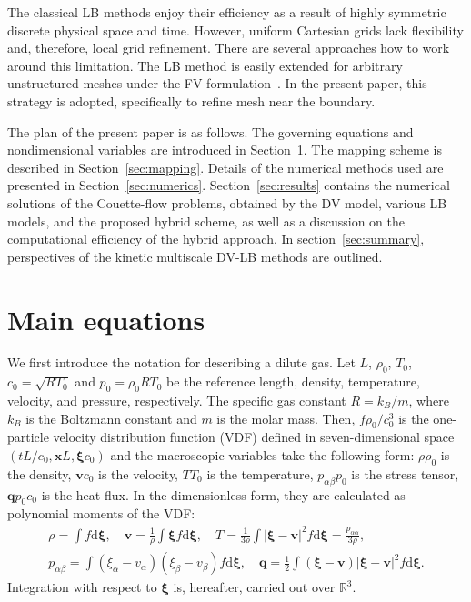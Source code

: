\documentclass{elsarticle} %
\newcommand{\dd}{\mathrm{d}}
\newcommand{\dxi}{\dd{\boldsymbol{\xi}}}
\newcommand{\bxi}{\boldsymbol{\xi}}
\newcommand{\bv}{\boldsymbol{v}}
\newcommand{\bq}{\boldsymbol{q}}
\newcommand{\bx}{\boldsymbol{x}}
\newcommand{\refer}[1]{#1_0}
\begin{document}
The classical LB methods enjoy their efficiency as a result of highly symmetric discrete physical space and time.
However, uniform Cartesian grids lack flexibility and, therefore, local grid refinement.
There are several approaches how to work around this limitation.
The LB method is easily extended for arbitrary unstructured meshes
under the FV formulation~\cite{Succi1992, Peng1999, Patil2009, Li2016}.
In the present paper, this strategy is adopted, specifically to refine mesh near the boundary.

The plan of the present paper is as follows.
The governing equations and nondimensional variables are introduced in Section~\ref{sec:equations}.
The mapping scheme is described in Section~\ref{sec:mapping}.
Details of the numerical methods used are presented in Section~\ref{sec:numerics}.
Section~\ref{sec:results} contains the numerical solutions of the Couette-flow problems, %
obtained by the DV model, various LB models, and the proposed hybrid scheme,
as well as a discussion on the computational efficiency of the hybrid approach.
In section~\ref{sec:summary}, perspectives of the kinetic multiscale DV-LB methods are outlined.

\section{Main equations}\label{sec:equations}

We first introduce the notation for describing a dilute gas.
Let \(L\), \(\refer\rho\), \(\refer{T}\), \(\refer{c} = \sqrt{R\refer{T}}\) and \(\refer{p} = \refer{\rho}R\refer{T}\) be
the reference length, density, temperature, velocity, and pressure, respectively.
The specific gas constant \(R = k_B/m\), where \(k_B\) is the Boltzmann constant and \(m\) is the molar mass.
Then, \(f\refer{\rho}/\refer{c}^3\) is the one-particle velocity distribution function (VDF)
defined in seven-dimensional space \((tL/\refer{c}, \bx L, \bxi \refer{c})\) and
the macroscopic variables take the following form:
\(\rho\refer{\rho}\) is the density, \(\bv\refer{c}\) is the velocity, \(T\refer{T}\) is the temperature,
\(p_{\alpha\beta}\refer{p}\) is the stress tensor, \(\bq\refer{p}\refer{c}\) is the heat flux.
In the dimensionless form, they are calculated as polynomial moments of the VDF:
\begin{equation}\label{eq:macro}
    \begin{gathered}
    \rho = \int f \dxi, \quad
    \bv = \frac1{\rho} \int \bxi f \dxi, \quad
    T = \frac{1}{3\rho}\int|\bxi-\bv|^2f \dxi = \frac{p_{\alpha\alpha}}{3\rho}, \\
    p_{\alpha\beta} = \int(\xi_\alpha - v_\alpha)(\xi_\beta - v_\beta) f \dxi, \quad
    \bq = \frac12\int(\bxi-\bv)|\bxi-\bv|^2 f \dxi.
    \end{gathered}
\end{equation}
Integration with respect to \(\bxi\) is, hereafter, carried out over \(\mathbb{R}^3\).
\end{document}
